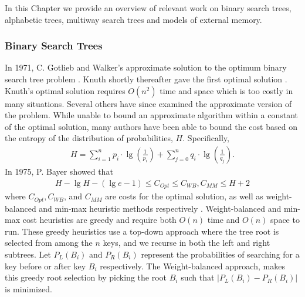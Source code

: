 \documentclass[]{beamer}
\theoremstyle{plain}
\begin{document}
\begin{frame}
In this Chapter we provide an overview of relevant work on binary search trees, alphabetic trees, multiway search trees and models of external memory.
\end{frame}



\begin{frame} \frametitle{Binary Search Trees}

In 1971, C. Gotlieb and Walker's approximate solution to the optimum binary search tree problem \cite{walker1971top}. Knuth shortly thereafter gave the first optimal solution \cite{knuth1971optimum}. Knuth's optimal solution requires $O(n^2)$ time and space which is too costly in many situations. Several others have since examined the approximate version of the problem. While unable to bound an approximate algorithm within a constant of the optimal solution, many authors have been able to bound the cost based on the entropy of the distribution of probabilities, $H$. Specifically, 
\begin{align*}
H = \sum_{i=1}^{n} p_i\cdot\lg(\frac{1}{p_i}) + \sum_{j=0}^{n} q_i\cdot\lg(\frac{1}{q_j}).
\end{align*}
In 1975, P. Bayer showed that 
\begin{align*}
H-\lg H-(\lg e-1) \leq C_{Opt} \leq C_{WB}, C_{MM} \leq H + 2
\end{align*}
where $C_{Opt}, C_{WB}$, and $C_{MM}$ are costs for the optimal solution, as well as weight-balanced and min-max heuristic methods respectively \cite{bayer1975improved}. Weight-balanced and min-max cost heuristics are greedy and require both $O(n)$ time and $O(n)$ space to run. These greedy heuristics use a top-down approach where the tree root is selected from among the $n$ keys, and we recurse in both the left and right subtrees. Let $P_L(B_i)$ and $P_R(B_i)$ represent the probabilities of searching for a key before or after key $B_i$ respectively. The Weight-balanced approach, makes this greedy root selection by picking the root $B_i$ such that $|P_L(B_i)-P_R(B_i)|$ is minimized.

\end{frame}
\end{document}
